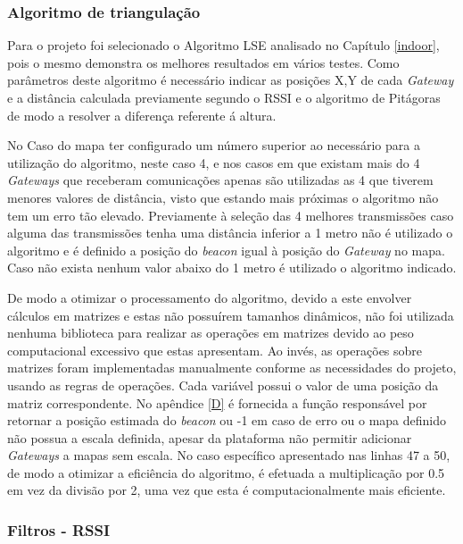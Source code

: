 \subsubsection{Algoritmo de triangulação}

\par Para o projeto foi selecionado o Algoritmo LSE analisado no Capítulo \ref{indoor}, pois o mesmo demonstra os melhores resultados em vários testes. Como parâmetros deste algoritmo é necessário indicar as posições X,Y de cada \textit{Gateway} e a distância calculada previamente segundo o RSSI e o algoritmo de Pitágoras de modo a resolver a diferença referente á altura.

\par No Caso do mapa ter configurado um número superior ao necessário para a utilização do algoritmo, neste caso 4, e nos casos em que existam mais do 4 \textit{Gateways} que receberam comunicações apenas são utilizadas as 4 que tiverem menores valores de distância, visto que estando mais próximas o algoritmo não tem um erro tão elevado. Previamente à seleção das 4 melhores transmissões caso alguma das transmissões tenha uma distância inferior a 1 metro não é utilizado o algoritmo e é definido a posição do \textit{beacon} igual à posição do \textit{Gateway} no mapa. Caso não exista nenhum valor abaixo do 1 metro é utilizado o algoritmo indicado.
 
\par De modo a otimizar o processamento do algoritmo, devido a este envolver cálculos em matrizes e estas não possuírem tamanhos dinâmicos, não foi utilizada nenhuma biblioteca para realizar as operações em matrizes devido ao peso computacional excessivo que estas apresentam. Ao invés, as operações sobre matrizes foram implementadas manualmente conforme as  necessidades do projeto, usando as regras de operações. Cada variável possui o valor de uma posição da matriz correspondente. No apêndice \ref{D} é fornecida a função responsável por retornar a posição estimada do \textit{beacon} ou -1 em caso de erro ou o mapa definido não possua a escala definida, apesar da plataforma não permitir adicionar \textit{Gateways} a mapas sem escala. No caso específico apresentado nas linhas 47 a 50, de modo a otimizar a eficiência do algoritmo, é efetuada a multiplicação por 0.5 em vez da divisão por 2, uma vez que esta é computacionalmente mais eficiente.
\subsubsection{Filtros - RSSI}

